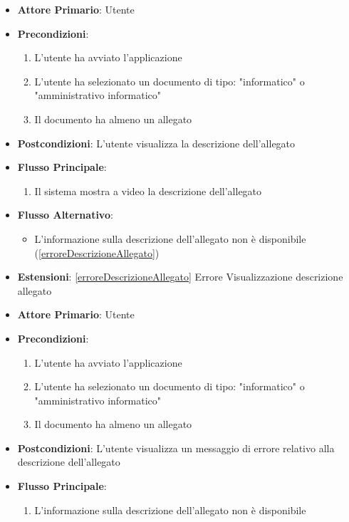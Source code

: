 \begin{itemize}
    \item \textbf{Attore Primario}: Utente
    \item \textbf{Precondizioni}:
    \begin{enumerate}
        \item L'utente ha avviato l'applicazione
        \item L'utente ha selezionato un documento di tipo: "informatico" o "amministrativo informatico"
        \item Il documento ha almeno un allegato
    \end{enumerate}
    \item \textbf{Postcondizioni}: L'utente visualizza la descrizione dell'allegato
    \item \textbf{Flusso Principale}:
    \begin{enumerate}
        \item Il sistema mostra a video la descrizione dell'allegato
    \end{enumerate}
    \item \textbf{Flusso Alternativo}:
    \begin{itemize}
        \item L'informazione sulla descrizione dell'allegato non è disponibile (\ref{erroreDescrizioneAllegato})
    \end{itemize}
    \item \textbf{Estensioni}: \ref{erroreDescrizioneAllegato} Errore Visualizzazione descrizione allegato
\end{itemize}

\begin{itemize}
    \item \textbf{Attore Primario}: Utente
    \item \textbf{Precondizioni}:
    \begin{enumerate}
        \item L'utente ha avviato l'applicazione
        \item L'utente ha selezionato un documento di tipo: "informatico" o "amministrativo informatico"
        \item Il documento ha almeno un allegato
    \end{enumerate}
    \item \textbf{Postcondizioni}: L'utente visualizza un messaggio di errore relativo alla descrizione dell'allegato
    \item \textbf{Flusso Principale}:
    \begin{enumerate}
        \item L'informazione sulla descrizione dell'allegato non è disponibile
    \end{enumerate}
\end{itemize}

